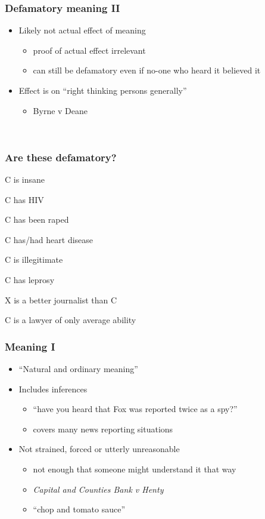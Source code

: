 \documentclass[ignorenonframetext,]{beamer}
\begin{document}
\begin{frame}
\frametitle{Defamatory meaning II}

\begin{itemize}
\item  {Likely} not {actual} effect of meaning

  \begin{itemize}
  \item    proof of actual effect irrelevant
  \item    can still be defamatory even if no-one who heard it believed
    it
  \end{itemize}
\item  Effect is on ``right thinking persons generally''

  \begin{itemize}
  \item    Byrne v Deane
  \end{itemize}
\end{itemize}

~


\end{frame}

\begin{frame}
\frametitle{Are these defamatory?}
  C is insane

  C has HIV

  C has been raped

  C has/had heart disease

  C is illegitimate

  C has leprosy

  X is a better journalist than C

  C is a lawyer of only average ability

\end{frame}

\begin{frame}
\frametitle{Meaning I}

\begin{itemize}
\item  ``Natural and ordinary meaning''
\item  Includes inferences
  \begin{itemize}
  \item    ``have you heard that Fox was reported twice as a spy?''
  \item    covers many news reporting situations
  \end{itemize}
\item  Not strained, forced or utterly unreasonable
  \begin{itemize}
  \item  not enough that someone {might}{ understand it that way}
  \item  {\it Capital and Counties Bank v Henty}
  \item  {``}{chop and tomato sauce''}
  \end{itemize}
\end{itemize}

\end{frame}
\end{document}
